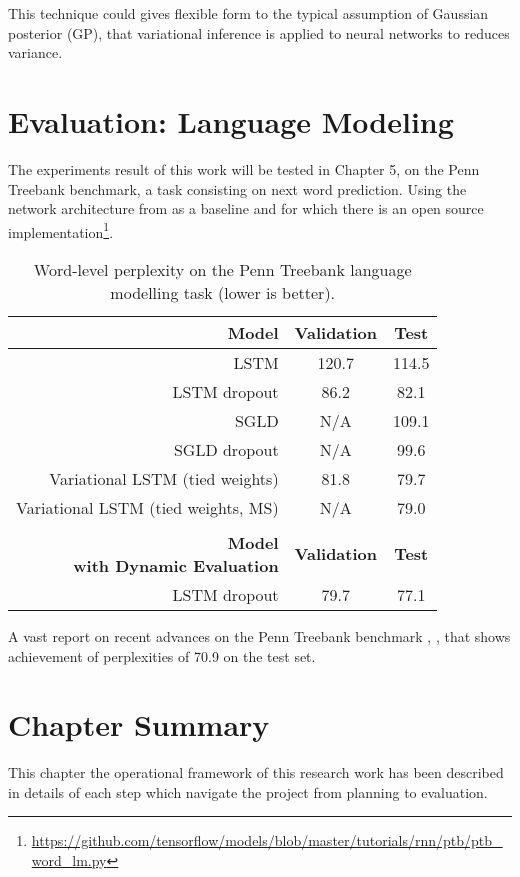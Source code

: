 This technique could gives flexible form  to the typical assumption of Gaussian posterior (GP), that variational inference is applied to neural networks to reduces variance.

\section{Evaluation: Language Modeling}
The experiments result of this work will be tested in Chapter 5, on the Penn Treebank \cite{Marcus1993} benchmark, a task consisting on next word prediction. Using the network architecture from \cite{Zaremba2014} as a baseline and for which there is an open source implementation\footnote{\url{https://github.com/tensorflow/models/blob/master/tutorials/rnn/ptb/ptb_word_lm.py}}.

\begin{table}[t]
	\caption{Word-level perplexity on the Penn Treebank language modelling task (lower is better).}
	\label{tab:ptb}
	\vskip 0.15in
	\centering
	\small
	\begin{tabular}{r|c|c}
		\textbf{Model}             & \textbf{Validation} & \textbf{Test} \\ 
		\hline
		\abovespace
		LSTM & 120.7 & 114.5\\
		LSTM dropout                        & 	86.2	        &	82.1 \\
		SGLD    	                        &	N/A				&	109.1		\\
		SGLD dropout	                    &	N/A				&	99.6		\\
		Variational LSTM (tied weights)     &	81.8        	&	79.7 \\
		Variational LSTM (tied weights, MS)	&	N/A		        &	79.0		\\
		\hline 
		& &  \\
		\shortstack{\textbf{Model} \\ \textbf{with Dynamic Evaluation}}
		& \textbf{Validation} & \textbf{Test} \\
		\hline
		\abovespace
		LSTM dropout                      & 	79.7	        &	77.1 \\
		\hline
	\end{tabular}
	\vskip -0.1in
\end{table}

A vast report on recent advances on the Penn Treebank benchmark \cite{Kim2016}, \cite{Zilly2016}, \cite{Merity2016} that shows achievement of perplexities of 70.9 on the test set.

\section{Chapter Summary}
This chapter the operational framework of this research work has been described in details of each step which navigate the project from planning to evaluation.